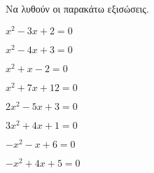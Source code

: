 Να λυθούν οι παρακάτω εξισώσεις.
\begin{multicols}{2}
\begin{alist}
\item $ x^2-3x+2=0 $
\item $ x^2-4x+3=0 $
\item $ x^2+x-2=0 $
\item $ x^2+7x+12=0 $
\item $ 2x^2-5x+3=0 $
\item $ 3x^2+4x+1=0 $
\item $ -x^2-x+6=0 $
\item $ -x^2+4x+5=0 $
\end{alist}
\end{multicols}
